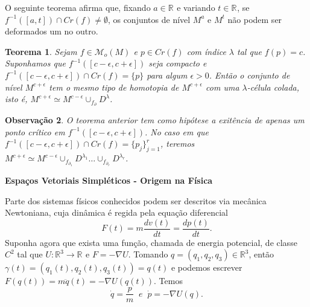 \documentclass{beamer}
\newcommand{\titulo}[1]{\centering \textbf{#1}}
\newtheorem{teorema}{Teorema}[section]
\newtheorem{observacao}[teorema]{Observação}
\newcommand{\derivada}[2]{\frac{d #1}{d #2}}
\newcommand{\funcoesmorse}[1]{\mathcal{M}_{o}(#1)}
\newcommand{\pontoscriticos}[1]{\textit{Cr}(#1)}
\newcommand{\real}[1]{\mathbb{R}^{#1}}
\newcommand{\reta}{\real{}}
\begin{document}
\begin{frame}
	O seguinte teorema afirma que, fixando $a \in \reta$ e variando $t \in \reta$, se $f^{-1}([a,t]) \cap \pontoscriticos{f} \neq \emptyset$, os conjuntos de nível $M^{a}$ e $M^{t}$ não podem ser deformados um no outro.
	
	\begin{teorema}
		Sejam $f\in \funcoesmorse{M}$ e $p\in \pontoscriticos{f}$ com índice $\lambda$ tal que $f(p) = c$. Suponhamos que $f^{-1}([c-\epsilon,c+\epsilon])$ seja compacto e $f^{-1}([c-\epsilon,c+\epsilon])\cap \pontoscriticos{f} = \{p\}$ para algum $\epsilon>0$. Então o conjunto de nível $M^{c+\epsilon}$ tem o mesmo tipo de homotopia de $M^{c+\epsilon}$ com uma $\lambda$-célula colada, isto é, $M^{c+\epsilon} \simeq M^{c-\epsilon}\cup_{f_{\partial}} D^{\lambda}$.
	\end{teorema}
	\begin{observacao}
		O teorema anterior tem como hipótese a exitência de apenas um ponto crítico em $f^{-1}([c-\epsilon,c+\epsilon])$. No caso em que $f^{-1}([c-\epsilon,c+\epsilon]) \cap \pontoscriticos{f} = \{p_{j}\}_{j=1}^{r}$, teremos $M^{c+\epsilon} \simeq M^{c-\epsilon}\cup_{f_{\partial_{1}}} D^{\lambda_{1}}\dots  \cup_{f_{\partial_{r}}} D^{\lambda_{r}}$.
	\end{observacao}
\end{frame}

\begin{frame}
	\titulo{Espaços Vetoriais Simpléticos - Origem na Física}
	
	Parte dos sistemas físicos conhecidos podem ser descritos via mecânica Newtoniana, cuja dinâmica é regida pela equação diferencial 
	$$
	F(t) = m\derivada{v(t)}{t} = \derivada{p(t)}{t}.
	$$
	Suponha agora que exista uma função, chamada de energia potencial, de classe $C^{2}$ tal que $U:\real{3}\to \reta$ e $F = -\nabla U$. Tomando $q=(q_{1},q_{2}, q_{3})\in \real{3}$, então $\gamma(t)=(q_{1}(t),q_{2}(t), q_{3}(t)) = q(t)$ e podemos escrever $F(q(t)) =m \ddot{q}(t)= -\nabla U(q(t))$. Temos
	$$
	\dot{q} = \frac{p}{m} \;\; e \;\;\dot{p} = -\nabla U(q).
	$$	
\end{frame}
\end{document}
